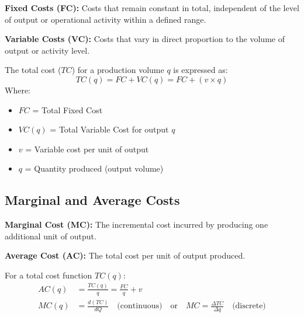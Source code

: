 \documentclass[12pt,a4paper]{article}
\begin{document}
\begin{tcolorbox}[defbox]
\textbf{Fixed Costs (FC):} Costs that remain constant in total, independent of the level of output or operational activity within a defined range. 
\par\vspace{3pt}
\textbf{Variable Costs (VC):} Costs that vary in direct proportion to the volume of output or activity level.
\end{tcolorbox}

\begin{tcolorbox}[formulabox, title={\textbf{Total Cost Equation}}]
The total cost ($TC$) for a production volume $q$ is expressed as:
\begin{equation}
  TC(q) = FC + VC(q) = FC + (v \times q)
\end{equation}
Where:
\begin{itemize}[leftmargin=1.5em, itemsep=1pt, topsep=2pt]
  \item[] $FC$ = Total Fixed Cost
  \item[] $VC(q)$ = Total Variable Cost for output $q$
  \item[] $v$ = Variable cost per unit of output
  \item[] $q$ = Quantity produced (output volume)
\end{itemize}
\end{tcolorbox}

\subsection{Marginal and Average Costs}

\begin{tcolorbox}[defbox]
\textbf{Marginal Cost (MC):} The incremental cost incurred by producing one additional unit of output.
\par\vspace{3pt}
\textbf{Average Cost (AC):} The total cost per unit of output produced.
\end{tcolorbox}

\begin{tcolorbox}[formulabox, title={\textbf{Average and Marginal Cost Formulas}}]
For a total cost function $TC(q)$:
\begin{align}
  AC(q) &= \frac{TC(q)}{q} = \frac{FC}{q} + v \\[6pt]
  MC(q) &= \frac{d(TC)}{dQ} \quad \text{(continuous)} \quad \text{or} \quad MC = \frac{\Delta TC}{\Delta q} \quad \text{(discrete)}
\end{align}
\end{tcolorbox}
\end{document}
